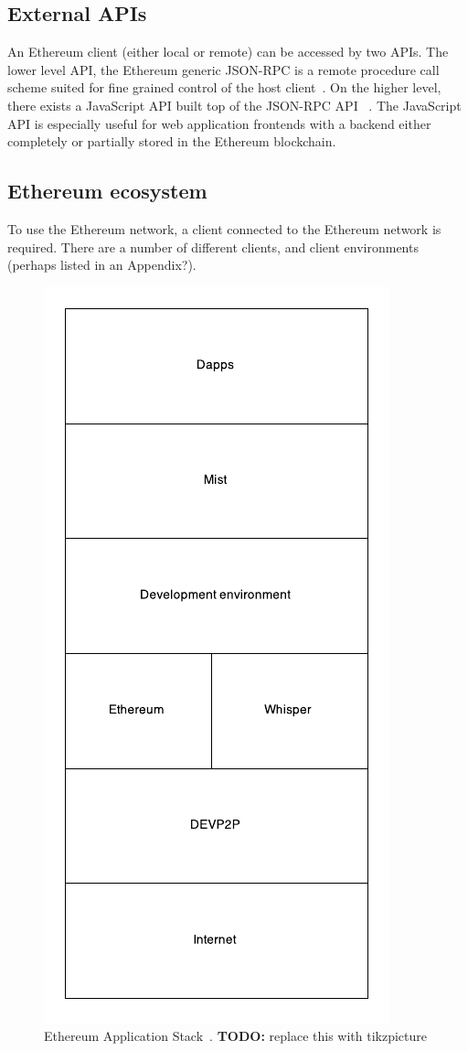 \subsection{External APIs}
An Ethereum client (either local or remote) can be accessed by two APIs. The lower level API, the Ethereum generic JSON-RPC is a remote procedure call scheme suited for fine grained control of the host client~\cite{generic-json-rpc}. On the higher level, there exists a JavaScript API built top of the JSON-RPC API ~\cite{javascript-api}. The JavaScript API is especially useful for web application frontends with a backend either completely or partially stored in the Ethereum blockchain.

\subsection{Ethereum ecosystem}
To use the Ethereum network, a client connected to the Ethereum network is required. There are a number of different clients, and client environments (perhaps listed in an Appendix?).

\begin{figure}[ht]
\centering
\includegraphics[width=0.30\linewidth]{figure/ethereum-applicationstack.pdf}
\centering
\caption{Ethereum Application Stack~\cite{eth:applicationstack}.
\textbf{TODO:} replace this with tikzpicture}
\end{figure}

